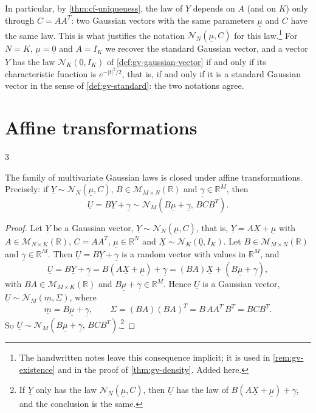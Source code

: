 In particular, by \cref{thm:cf-uniqueness}, the law of $\underline Y$ depends on $A$ (and on $K$)
only through $C=AA^T$: two Gaussian vectors with the same parameters $\underline\mu$ and $C$ have
the same law. This is what justifies the notation $\mathcal N_N(\underline\mu,C)$ for this
law.\footnote{The handwritten notes leave this consequence implicit; it is used in
\cref{rem:gv-existence} and in the proof of \cref{thm:gv-density}. Added here.} For $N=K$,
$\underline\mu=\underline 0$ and $A=I_K$ we recover the standard Gaussian vector, and a vector
$\underline Y$ has the law $\mathcal N_K(\underline 0,I_K)$ of \cref{def:gv-gaussian-vector} if and
only if its characteristic function is $e^{-|\underline t|^2/2}$, that is, if and only if it is a
standard Gaussian vector in the sense of \cref{def:gv-standard}: the two notations agree.

\section{Affine transformations}\label{sec:gv-affine}

\textcircled{\scriptsize 3}

\begin{theorem}\label{thm:gv-affine}
The family of multivariate Gaussian laws is closed under affine transformations. Precisely: if
$\underline Y\sim\mathcal N_N(\underline\mu,C)$, $B\in\mathcal M_{M\times N}(\mathbb R)$ and
$\underline\gamma\in\mathbb R^M$, then
\[
  \underline U=B\underline Y+\underline\gamma\sim\mathcal N_M(B\underline\mu+\underline\gamma,\,BCB^T).
\]
\end{theorem}

\begin{proof}
Let $\underline Y$ be a Gaussian vector, $\underline Y\sim\mathcal N_N(\underline\mu,C)$, that is,
$\underline Y=A\underline X+\underline\mu$ with $A\in\mathcal M_{N\times K}(\mathbb R)$, $C=AA^T$,
$\underline\mu\in\mathbb R^N$ and $\underline X\sim\mathcal N_K(\underline 0,I_K)$. Let
$B\in\mathcal M_{M\times N}(\mathbb R)$ and $\underline\gamma\in\mathbb R^M$. Then
$\underline U=B\underline Y+\underline\gamma$ is a random vector with values in $\mathbb R^M$, and
\[
  \underline U=B\underline Y+\underline\gamma=B(A\underline X+\underline\mu)+\underline\gamma
  =(BA)\underline X+(B\underline\mu+\underline\gamma),
\]
with $BA\in\mathcal M_{M\times K}(\mathbb R)$ and $B\underline\mu+\underline\gamma\in\mathbb R^M$.
Hence $\underline U$ is a Gaussian vector, $\underline U\sim\mathcal N_M(\underline m,\Sigma)$, where
\[
  \underline m=B\underline\mu+\underline\gamma,\qquad
  \Sigma=(BA)(BA)^T=B\,AA^T\,B^T=BCB^T .
\]
So $\underline U\sim\mathcal N_M(B\underline\mu+\underline\gamma,\,BCB^T)$.\footnote{If
$\underline Y$ only has the law $\mathcal N_N(\underline\mu,C)$, then $\underline U$ has the law of
$B(A\underline X+\underline\mu)+\underline\gamma$, and the conclusion is the same.}
\end{proof}


